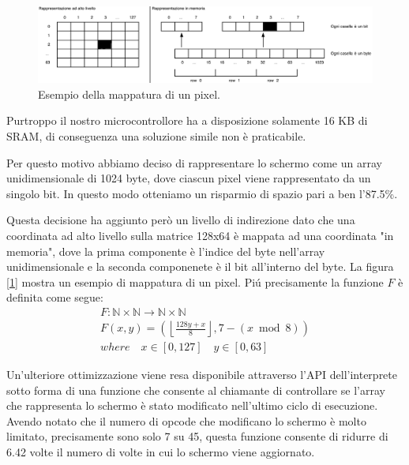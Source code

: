 \documentclass[a4paper]{article}
\begin{document}
\begin{figure}[h!t]
    \begin{center}
        \includegraphics[scale=0.38]{figures/screenopt_small.pdf}
    \end{center}
    \caption{Esempio della mappatura di un pixel.}
    \label{fig:screenopt}
\end{figure}

Purtroppo il nostro microcontrollore ha a disposizione solamente 16 KB di SRAM, di conseguenza una soluzione simile non è praticabile.

Per questo motivo abbiamo deciso di rappresentare lo schermo come un array unidimensionale di 1024 byte, dove ciascun pixel viene rappresentato da un singolo bit. In questo modo otteniamo un risparmio di spazio pari a ben l'87.5\%.

Questa decisione ha aggiunto però un livello di indirezione dato che una coordinata ad alto livello sulla matrice 128x64 è mappata ad una coordinata "in memoria", dove la prima componente è l'indice del byte nell'array unidimensionale e la seconda componenete è il bit all'interno del byte. La figura [\ref{fig:screenopt}] mostra un esempio di mappatura di un pixel. Piú precisamente la funzione $F$ è definita come segue:
\begin{gather*}
    F: \mathbb{N} \times \mathbb{N} \rightarrow \mathbb{N} \times \mathbb{N} \\
    F(x, y) = \left(\left\lfloor \frac{128y + x}{8} \right\rfloor, 7 - (x \bmod 8)\right) \\
    where \quad x \in [0, 127] \quad y \in [0, 63]
\end{gather*}

Un'ulteriore ottimizzazione viene resa disponibile attraverso l'API dell'interprete sotto forma di una funzione che consente al chiamante di controllare se l'array che rappresenta lo schermo è stato modificato nell'ultimo ciclo di esecuzione. Avendo notato che il numero di opcode che modificano lo schermo è molto limitato, precisamente sono solo 7 su 45, questa funzione consente di ridurre di 6.42 volte il numero di volte in cui
lo schermo viene aggiornato.
\end{document}
